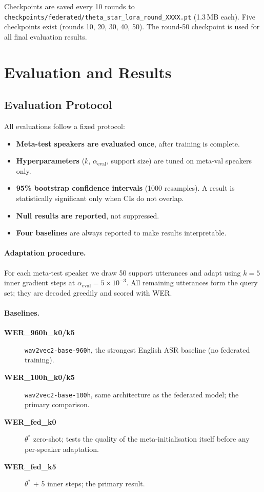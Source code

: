 \documentclass[12pt]{article}
\theoremstyle{plain}
\begin{document}
Checkpoints are saved every 10 rounds to
\verb|checkpoints/federated/theta_star_lora_round_XXXX.pt| (1.3\,MB each).
Five checkpoints exist (rounds 10, 20, 30, 40, 50).
The round-50 checkpoint is used for all final evaluation results.

\section{Evaluation and Results}
\label{sec:eval}

\subsection{Evaluation Protocol}

All evaluations follow a fixed protocol:

\begin{itemize}
  \item \textbf{Meta-test speakers are evaluated once}, after training is complete.
  \item \textbf{Hyperparameters} ($k$, $\alpha_\mathrm{eval}$, support size) are
        tuned on meta-val speakers only.
  \item \textbf{95\% bootstrap confidence intervals} (1000 resamples).
        A result is statistically significant only when CIs do not overlap.
  \item \textbf{Null results are reported}, not suppressed.
  \item \textbf{Four baselines} are always reported to make results interpretable.
\end{itemize}

\paragraph{Adaptation procedure.}
For each meta-test speaker we draw 50 support utterances and adapt using $k=5$
inner gradient steps at $\alpha_\mathrm{eval} = 5 \times 10^{-3}$.
All remaining utterances form the query set; they are decoded greedily and
scored with WER.

\paragraph{Baselines.}
\begin{description}
  \item[\textbf{WER\_960h\_k0/k5}] \texttt{wav2vec2-base-960h}, the strongest
        English ASR baseline (no federated training).
  \item[\textbf{WER\_100h\_k0/k5}] \texttt{wav2vec2-base-100h}, same architecture
        as the federated model; the primary comparison.
  \item[\textbf{WER\_fed\_k0}] $\theta^*$ zero-shot; tests the quality of the
        meta-initialisation itself before any per-speaker adaptation.
  \item[\textbf{WER\_fed\_k5}] $\theta^*$ + 5 inner steps; the primary result.
\end{description}
\end{document}
